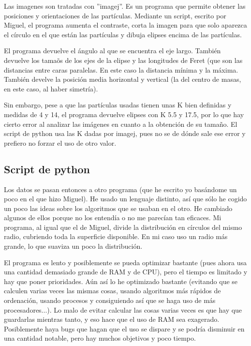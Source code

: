 \documentclass[twoside]{article}
\begin{document}
\begin{multicols}{2}
Las imagenes son tratadas con ''imagej''. Es un programa que permite obtener las posiciones y orientaciones de las part\'iculas. Mediante un script, escrito por Miguel, el programa aumenta el contraste, corta la imagen para que solo aparezca el c\'irculo en el que est\'an las part\'iculas y dibuja elipses encima de las part\'iculas. 

El programa devuelve el \'angulo al que se encuentra el eje largo. Tambi\'en devuelve los tama\~os de los ejes de la elipse y las longitudes de Feret (que son las distancias entre caras paralelas. En este caso la distancia m\'inima y la m\'axima. Tambi\'en develve la posici\'on media horizontal y vertical (la del centro de masas, en este caso, al haber simetr\'ia).

Sin embargo, pese a que las part\'iculas usadas tienen unas K bien definidas y medidas de 4 y 14, el programa devuelve elipses con K 5.5 y 17.5, por lo que hay cierto error al analizar las im\'agenes en cuanto a la obtenci\'on de su tama\~no. El script de python usa las K dadas por imagej, pues no se de d\'onde sale ese error y prefiero no forzar el uso de otro valor.

\subsection*{Script de python}

Los datos se pasan entonces a otro programa (que he escrito yo bas\'andome un poco en el que hizo Miguel). He usado un lenguaje distinto, as\'i que s\'olo he cogido un poco las ideas sobre los algoritmos que se usaban en el otro. He cambiado algunos de ellos porque no los entend\'ia o no me parec\'ian tan eficaces. Mi programa, al igual que el de Miguel, divide la distribuci\'on en c\'irculos del mismo radio, cubriendo toda la superficie disponible. En mi caso uso un radio m\'as grande, lo que suaviza un poco la distribuci\'on.

El programa es lento y posiblemente se pueda optimizar bastante (pues ahora usa una cantidad demasiado grande de RAM y de CPU), pero el tiempo es limitado y hay que poner prioridades. A\'un as\'i lo he optimizado bastante (evitando que se calculen varias veces las mismas cosas, usando algoritmos m\'as r\'apidos de ordenaci\'on, usando procesos y consiguiendo as\'i que se haga uso de m\'as procesadores...). Lo malo de evitar calcular las cosas varias veces es que hay que guardarlas mientras tanto, y eso hace que el uso de RAM sea exagerado. Posiblemente haya bugs que hagan que el uso se dispare y se podr\'ia disminuir en una cantidad notable, pero hay muchos objetivos y poco tiempo.


\end{multicols}
\end{document}
